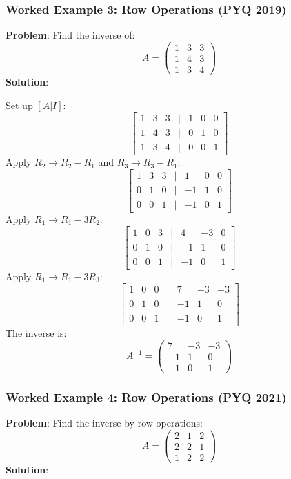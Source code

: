 \documentclass[
]{article}
\begin{document}
\subsubsection{Worked Example 3: Row Operations (PYQ
2019)}\label{worked-example-3-row-operations-pyq-2019}

\textbf{Problem}: Find the inverse of:
\[
A =
\begin{pmatrix}
1 & 3 & 3 \\
1 & 4 & 3 \\
1 & 3 & 4
\end{pmatrix}
\]
\textbf{Solution}:

Set up \([A \lvert  I]\):
\[
\begin{bmatrix}
1 & 3 & 3 & | & 1 & 0 & 0 \\
1 & 4 & 3 & | & 0 & 1 & 0 \\
1 & 3 & 4 & | & 0 & 0 & 1
\end{bmatrix}
\]
Apply \(R_2 \to R_2 - R_1\) and \(R_3 \to R_3 - R_1\):
\[
\begin{bmatrix}
1 & 3 & 3 & | & 1 & 0 & 0 \\
0 & 1 & 0 & | & -1 & 1 & 0 \\
0 & 0 & 1 & | & -1 & 0 & 1
\end{bmatrix}
\]
Apply \(R_1 \to R_1 - 3R_2\):
\[
\begin{bmatrix}
1 & 0 & 3 & | & 4 & -3 & 0 \\
0 & 1 & 0 & | & -1 & 1 & 0 \\
0 & 0 & 1 & | & -1 & 0 & 1
\end{bmatrix}
\]
Apply \(R_1 \to R_1 - 3R_3\):
\[
\begin{bmatrix}
1 & 0 & 0 & | & 7 & -3 & -3 \\
0 & 1 & 0 & | & -1 & 1 & 0 \\
0 & 0 & 1 & | & -1 & 0 & 1
\end{bmatrix}
\]
The inverse is:
\[
A^{-1} =
\begin{pmatrix}
7 & -3 & -3 \\
-1 & 1 & 0 \\
-1 & 0 & 1
\end{pmatrix}
\]

\subsubsection{Worked Example 4: Row Operations (PYQ
2021)}\label{worked-example-4-row-operations-pyq-2021}

\textbf{Problem}: Find the inverse by row operations:
\[
A =
\begin{pmatrix}
2 & 1 & 2 \\
2 & 2 & 1 \\
1 & 2 & 2
\end{pmatrix}
\]
\textbf{Solution}:
\end{document}

